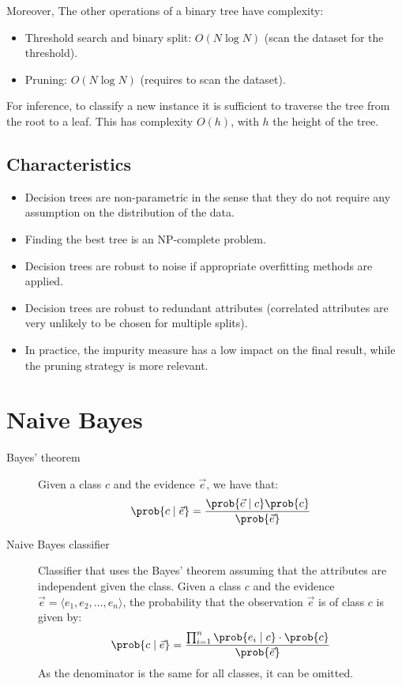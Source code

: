 Moreover, The other operations of a binary tree have complexity:
\begin{itemize}
    \item Threshold search and binary split: $O(N \log N)$ (scan the dataset for the threshold).
    \item Pruning: $O(N \log N)$ (requires to scan the dataset).
\end{itemize}

For inference, to classify a new instance it is sufficient to traverse the tree from the root to a leaf.
This has complexity $O(h)$, with $h$ the height of the tree.


\subsection{Characteristics}
\begin{itemize}
    \item Decision trees are non-parametric in the sense that they do not require any assumption on the distribution of the data.
    \item Finding the best tree is an NP-complete problem.
    \item Decision trees are robust to noise if appropriate overfitting methods are applied.
    \item Decision trees are robust to redundant attributes (correlated attributes are very unlikely to be chosen for multiple splits).
    \item In practice, the impurity measure has a low impact on the final result, while the pruning strategy is more relevant.
\end{itemize}



\section{Naive Bayes}

\begin{description}
    \item[Bayes' theorem]
        Given a class $c$ and the evidence $\vec{e}$, we have that:
        \[ \prob{c \mid \vec{e}} = \frac{\prob{\vec{e} \mid c} \prob{c}}{\prob{\vec{e}}} \]

    \item[Naive Bayes classifier] 
        Classifier that uses the Bayes' theorem assuming that the attributes are independent given the class.
        Given a class $c$ and the evidence $\vec{e} = \langle e_1, e_2, \dots, e_n \rangle$, the probability that 
        the observation $\vec{e}$ is of class $c$ is given by:
        \[
            \prob{c \mid \vec{e}} = \frac{\prod_{i=1}^{n}\prob{e_i \mid c} \cdot \prob{c}}{\prob{\vec{e}}}  
        \]
        As the denominator is the same for all classes, it can be omitted.
\end{description}


